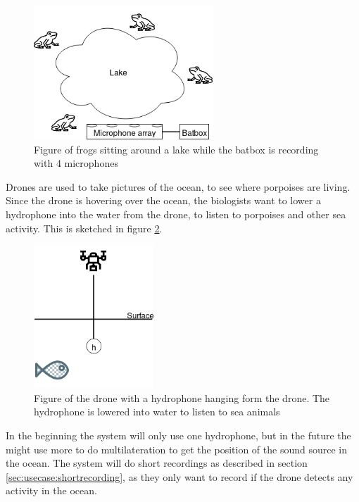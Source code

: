 \begin{figure}[H]
	\centering
	\includegraphics[width=0.6\textwidth]{figures/usecases_frogs}
	\caption{Figure of frogs sitting around a lake while the batbox is recording with 4 microphones} \label{fig:usecase:frogs}
\end{figure}

 \label{sec:usecase:drone}
Drones are used to take pictures of the ocean, to see where porpoises are living.
Since the drone is hovering over the ocean, the biologists want to lower a hydrophone into the water from the drone, to listen to porpoises and other sea activity. This is sketched in figure \ref{fig:usecase:drone}.

\begin{figure}[h!]
	\centering
	\includegraphics[width=0.4\textwidth]{figures/usecase_drone}
	\caption{Figure of the drone with a hydrophone hanging form the drone. The hydrophone is lowered into water to listen to sea animals}\label{fig:usecase:drone}
\end{figure}

In the beginning the system will only use one hydrophone, but in the future the might use more to do multilateration to get the position of the sound source in the ocean.
The system will do short recordings as described in section \ref{sec:usecase:shortrecording}, as they only want to record if the drone detects any activity in the ocean.

